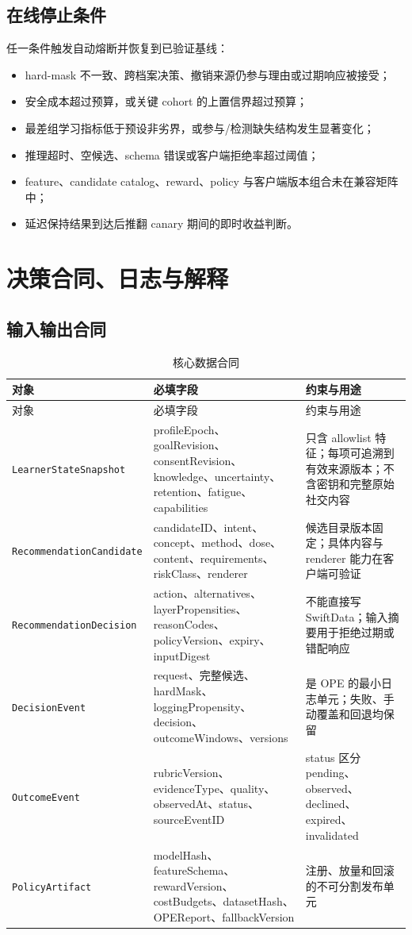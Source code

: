 \documentclass[11pt,a4paper,fontset=none]{ctexart}
\newcommand{\1}{\mathbb{I}}
\newcommand{\contractname}[1]{{\footnotesize\texttt{#1}}}
\begin{document}
\subsection{在线停止条件}

任一条件触发自动熔断并恢复到已验证基线：
\begin{itemize}
  \item hard-mask 不一致、跨档案决策、撤销来源仍参与理由或过期响应被接受；
  \item 安全成本超过预算，或关键 cohort 的上置信界超过预算；
  \item 最差组学习指标低于预设非劣界，或参与/检测缺失结构发生显著变化；
  \item 推理超时、空候选、schema 错误或客户端拒绝率超过阈值；
  \item feature、candidate catalog、reward、policy 与客户端版本组合未在兼容矩阵中；
  \item 延迟保持结果到达后推翻 canary 期间的即时收益判断。
\end{itemize}

\section{决策合同、日志与解释}

\subsection{输入输出合同}

\begin{longtable}{L{46mm}L{40mm}L{60mm}}
  \caption{核心数据合同}\label{tab:contracts}\\
  \toprule
  对象 & 必填字段 & 约束与用途 \\
  \midrule
  \endfirsthead
  \toprule
  对象 & 必填字段 & 约束与用途 \\
  \midrule
  \endhead
  \bottomrule
  \endfoot
  \contractname{LearnerStateSnapshot} & profileEpoch、goalRevision、consentRevision、knowledge、uncertainty、retention、fatigue、capabilities & 只含 allowlist 特征；每项可追溯到有效来源版本；不含密钥和完整原始社交内容 \\
  \contractname{RecommendationCandidate} & candidateID、intent、concept、method、dose、content、requirements、riskClass、renderer & 候选目录版本固定；具体内容与 renderer 能力在客户端可验证 \\
  \contractname{RecommendationDecision} & action、alternatives、layerPropensities、reasonCodes、policyVersion、expiry、inputDigest & 不能直接写 SwiftData；输入摘要用于拒绝过期或错配响应 \\
  \contractname{DecisionEvent} & request、完整候选、hardMask、loggingPropensity、decision、outcomeWindows、versions & 是 OPE 的最小日志单元；失败、手动覆盖和回退均保留 \\
  \contractname{OutcomeEvent} & rubricVersion、evidenceType、quality、observedAt、status、sourceEventID & status 区分 pending、observed、declined、expired、invalidated \\
  \contractname{PolicyArtifact} & modelHash、featureSchema、rewardVersion、costBudgets、datasetHash、OPEReport、fallbackVersion & 注册、放量和回滚的不可分割发布单元 \\
\end{longtable}
\end{document}
